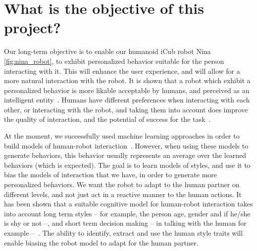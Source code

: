 \section{What is the objective of this project?}
\par Our long-term objective is to enable our humanoid iCub robot Nina \ref{fig:nina_robot}, to exhibit personalized behavior suitable for the person interacting with it. This will enhance the user experience, and will allow for a more natural interaction with the robot. It is shown that a robot which exhibit a personalized behavior is more likable acceptable by humans, and perceived as an intelligent entity~\citep{churamani2017impact}. Humans have different preferences when interacting with each other, or interacting with the robot, and taking them into account does improve the quality of interaction, and the potential of success for the task~\citep{kashi2018smooth}.

\par At the moment, we successfully used machine learning approaches in order to build models of human-robot interaction~\citep{mihoub2016graphical,bailly:hal-01939223,nguyen:hal-01609535}. However, when using these models to generate behaviors, this behavior usually represents an average over the learned behaviors (which is expected). The goal is to learn models of styles, and use it to bias the models of interaction that we have, in order to generate more personalized behaviors. We want the robot to adapt to the human partner on different levels, and not just act in a reactive manner to the human actions. It has been shown that a suitable cognitive model for human-robot interaction takes into account long term styles -- for example, the person age, gender and if he/she is shy or not --, and short term decision making -- in talking with the human for example --~\citep{thorisson2002natural,bailly2010gaze}. The ability to identify, extract and use the human style traits will enable biasing the robot model to adapt for the human partner.

